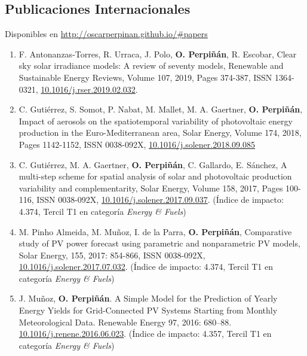 \documentclass[article, a4paper]{memoir}
\begin{document}
\subsection{Publicaciones Internacionales}
\label{sec:org178d0f5}
Disponibles en \url{http://oscarperpinan.github.io/\#papers}

\begin{enumerate}
\item F. Antonanzas-Torres, R. Urraca, J. Polo, \textbf{O. Perpiñán},
R. Escobar, Clear sky solar irradiance models: A review of seventy
models, Renewable and Sustainable Energy Reviews, Volume 107, 2019,
Pages 374-387, ISSN 1364-0321, \href{https://doi.org/10.1016/j.rser.2019.02.032}{10.1016/j.rser.2019.02.032}.

\item C. Gutiérrez, S. Somot, P. Nabat, M. Mallet, M. A. Gaertner,
\textbf{O. Perpiñán}, Impact of aerosols on the spatiotemporal variability
of photovoltaic energy production in the Euro-Mediterranean area,
Solar Energy, Volume 174, 2018, Pages 1142-1152, ISSN 0038-092X,
\href{https://doi.org/10.1016/j.solener.2018.09.085}{10.1016/j.solener.2018.09.085}

\item C. Gutiérrez, M. A. Gaertner, \textbf{O. Perpiñán}, C. Gallardo,
E. Sánchez, A multi-step scheme for spatial analysis of solar and
photovoltaic production variability and complementarity, Solar
Energy, Volume 158, 2017, Pages 100-116, ISSN 0038-092X,
\href{https://doi.org/10.1016/j.solener.2017.09.037}{10.1016/j.solener.2017.09.037}. (Índice de impacto: 4.374, Tercil T1
en categoría \emph{Energy \& Fuels})

\item M. Pinho Almeida, M. Muñoz, I. de la Parra, \textbf{O. Perpiñán},
Comparative study of PV power forecast using parametric and
nonparametric PV models, Solar Energy, 155, 2017: 854-866, ISSN
0038-092X, \href{https://doi.org/10.1016/j.solener.2017.07.032}{10.1016/j.solener.2017.07.032}. (Índice de impacto:
4.374, Tercil T1 en categoría \emph{Energy \& Fuels})

\item J. Muñoz, \textbf{O. Perpiñán}. A Simple Model for the Prediction of
Yearly Energy Yields for Grid-Connected PV Systems Starting from
Monthly Meteorological Data. Renewable Energy 97, 2016:
680–88. \href{http://dx.doi.org/10.1016/j.renene.2016.06.023}{10.1016/j.renene.2016.06.023}. (Índice de impacto: 4.357,
Tercil T1 en categoría \emph{Energy \& Fuels})


\end{enumerate}
\end{document}
